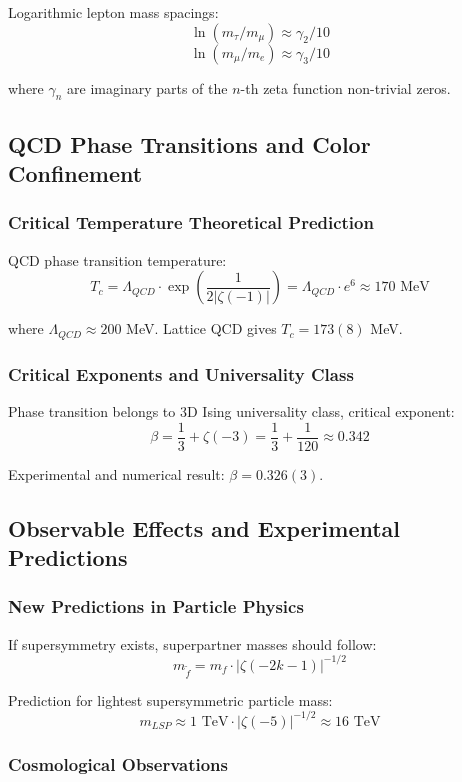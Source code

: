 \documentclass[11pt]{article}
\begin{document}
Logarithmic lepton mass spacings:
$$\ln(m_{\tau}/m_{\mu}) \approx \gamma_2/10$$
$$\ln(m_{\mu}/m_e) \approx \gamma_3/10$$

where $\gamma_n$ are imaginary parts of the $n$-th zeta function non-trivial zeros.

\subsection{QCD Phase Transitions and Color Confinement}

\subsubsection{Critical Temperature Theoretical Prediction}

QCD phase transition temperature:
$$T_c = \Lambda_{QCD} \cdot \exp\left(\frac{1}{2|\zeta(-1)|}\right) = \Lambda_{QCD} \cdot e^{6} \approx 170 \text{ MeV}$$

where $\Lambda_{QCD} \approx 200$ MeV. Lattice QCD gives $T_c = 173(8)$ MeV.

\subsubsection{Critical Exponents and Universality Class}

Phase transition belongs to 3D Ising universality class, critical exponent:
$$\beta = \frac{1}{3} + \zeta(-3) = \frac{1}{3} + \frac{1}{120} \approx 0.342$$

Experimental and numerical result: $\beta = 0.326(3)$.

\subsection{Observable Effects and Experimental Predictions}

\subsubsection{New Predictions in Particle Physics}

If supersymmetry exists, superpartner masses should follow:
$$m_{\tilde{f}} = m_f \cdot |\zeta(-2k-1)|^{-1/2}$$

Prediction for lightest supersymmetric particle mass:
$$m_{LSP} \approx 1 \text{ TeV} \cdot |\zeta(-5)|^{-1/2} \approx 16 \text{ TeV}$$

\subsubsection{Cosmological Observations}
\end{document}
